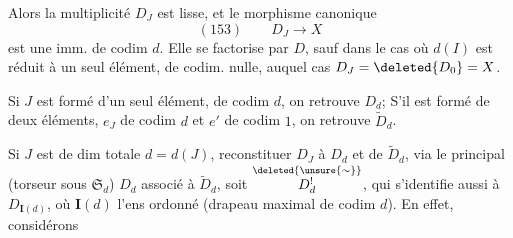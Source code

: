 
Alors la multiplicité $D_J$ est lisse,  et le morphisme canonique
\[
(153)\qquad D_J\longrightarrow X
\]
est une imm.  de codim $d$.
Elle se factorise par $D$, sauf dans le cas où $d(I)$ est réduit à un seul élément, de codim. nulle, auquel cas $D_J=\deleted{D_0}=X$.

Si $J$ est formé d'un seul élément, de codim $d$, on retrouve $D_d$; S'il est formé de deux éléments,  $e_J$ de codim $d$ et $e'$ de codim $1$, on retrouve $\widetilde D_d$.

Si $J$ est de dim totale $d=d(J)$,   reconstituer $D_J$ à  $D_d$ et de $\widetilde D_d$, via le  principal (torseur sous $\mathfrak S_d$)  $D_d$ associé à $\widetilde D_d$, soit $\overset{\deleted{\unsure{\sim}}}{D^!_d}$, qui s'identifie aussi à $D_{\mathbf I(d)}$, où $\mathbf I(d)$ l'ens ordonné
(drapeau maximal de codim $d$). En effet, considérons
